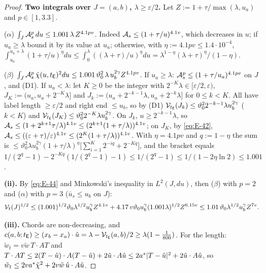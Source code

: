 \begin{proof}
\textbf{Two integrals over $J=(a,b)$, $\lambda\ge\varepsilon/2$.} Let $Z:=1+\tau/\max(\lambda,u_a)$ and $p\in[1,3.3]$.

($\alpha$) $\int_J\mathcal A_s^p\,du\le1.001\,\lambda\,Z^{4.1pv}$. Indeed $\mathcal A_s\le(1+\tau/u)^{4.1v}$, which decreases in $u$; if
$u_a\ge\lambda$ bound it by its value at $u_a$; otherwise, with $\eta:=4.1pv\le1.4\cdot10^{-4}$,
$\int_{u_a}^{u_a+\lambda}(1+\tau/u)^\eta du\le\int_0^\lambda((\lambda+\tau)/u)^\eta du=\lambda^{1-\eta}(\lambda+\tau)^\eta/(1-\eta)$.

($\beta$) $\int_J\mathcal A_s^p\,\tilde\chi(u,t_{\mathsf E})^2du\le1.001\,\vartheta_0^2\,\lambda\,u_b^{2\gamma}Z^{4.1pv}$. If $u_a\ge\lambda$:
$\mathcal A_s^p\le(1+\tau/u_a)^{4.1pv}$ on $J$, and (D1). If $u_a<\lambda$: let $K\ge0$ be the integer with
$2^{-K}\lambda\in[\varepsilon/2,\varepsilon)$, $J_K:=(u_a,u_a+2^{-K}\lambda]$ and
$J_k:=(u_a+2^{-k-1}\lambda,u_a+2^{-k}\lambda]$ for $0\le k<K$. All have label length $\ge\varepsilon/2$ and right end $\le u_b$, so
by (D1) $\mathcal V_{t_{\mathsf E}}(J_k)\le\vartheta_0^22^{-k-1}\lambda u_b^{2\gamma}$ ($k<K$) and
$\mathcal V_{t_{\mathsf E}}(J_K)\le\vartheta_0^22^{-K}\lambda u_b^{2\gamma}$. On $J_k$, $u\ge2^{-k-1}\lambda$, so
$\mathcal A_s\le(1+2^{k+1}\tau/\lambda)^{4.1v}\le(2^{k+1}(1+\tau/\lambda))^{4.1v}$; on $J_K$, by \eqref{eq:E-42},
$\mathcal A_s\le((\varepsilon+\tau)/\varepsilon)^{4.1v}\le(2^K(1+\tau/\lambda))^{4.1v}$. With $\eta=4.1pv$ and $q:=1-\eta$ the sum is
$\le\vartheta_0^2\lambda u_b^{2\gamma}(1+\tau/\lambda)^\eta\bigl[\sum_{i=1}^K2^{-iq}+2^{-Kq}\bigr]$, and the bracket equals
$1/(2^q-1)-2^{-Kq}(1/(2^q-1)-1)\le1/(2^q-1)\le1/(1-2\eta\ln2)\le1.001$.

\textbf{(ii).} By \eqref{eq:E-44} and Minkowski's inequality in $L^2(J,du)$, then ($\beta$) with $p=2$ and ($\alpha$) with $p=3$
($\bar u_s\le u_b$ on $J$):
\[
\mathcal V_t(J)^{1/2}\le(1.001)^{1/2}\vartheta_0\lambda^{1/2}u_b^\gamma Z^{4.1v}+4.17\,v\vartheta_0u_b^\gamma(1.001\lambda)^{1/2}Z^{6.15v}
\le1.01\,\vartheta_0\lambda^{1/2}u_b^\gamma Z^{7v}.
\]

\textbf{(iii).} Chords are non-decreasing, and
$c(a,b;t_{\mathsf E})\ge(x_b-x_a)\cdot\hat u=\lambda-\mathcal V_{t_{\mathsf E}}(a,b)/2\ge\lambda(1-\frac1{800})$. For the length:
$\tilde w_t=v\tilde w\,T\cdot AT$ and $T\cdot AT\le2(T-\hat u)\cdot A(T-\hat u)+2\hat u\cdot A\hat u\le2a^*|T-\hat u|^2+2\hat u\cdot A\hat u$, so
$\tilde w_t\le2va^*\tilde\chi^2+2v\tilde w\,\hat u\cdot A\hat u$.


\end{proof}
